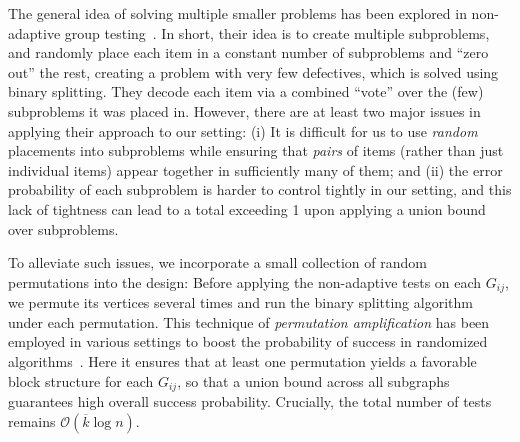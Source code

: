 \documentclass[journal]{IEEEtran}
\theoremstyle{definition}
\theoremstyle{definition}
\newcommand{\kb}{\overline{k}}
\newcommand{\bigO}{\mathcal{O}}
\begin{document}
The general idea of solving multiple smaller problems has been explored in non-adaptive group testing~\cite{li2024noisy}.  In short, their idea is to create multiple subproblems, and randomly place each item in a constant number of subproblems and ``zero out'' the rest, creating a problem with very few defectives, which is solved using binary splitting.  They decode each item via a combined ``vote'' over the (few) subproblems it was placed in.  However, there are at least two major issues in applying their approach to our setting: (i) It is difficult for us to use \emph{random} placements into subproblems while ensuring that \emph{pairs} of items (rather than just individual items) appear together in sufficiently many of them; and (ii) the error probability of each subproblem is harder to control tightly in our setting, and this lack of tightness can lead to a total exceeding 1 upon applying a union bound over subproblems.







To alleviate such issues, we incorporate a small collection of random permutations into the design: Before applying the non-adaptive tests on each $G_{ij}$, we permute its vertices several times and run the binary splitting algorithm under each permutation. This technique of \emph{permutation amplification} has been employed in various settings to boost the probability of success in randomized algorithms~\cite{motwani1996randomized}. Here it ensures that at least one permutation yields a favorable block structure for each $G_{ij}$, so that a union bound across all subgraphs guarantees high overall success probability. Crucially, the total number of tests remains $\bigO(\kb\log n)$.
\end{document}
